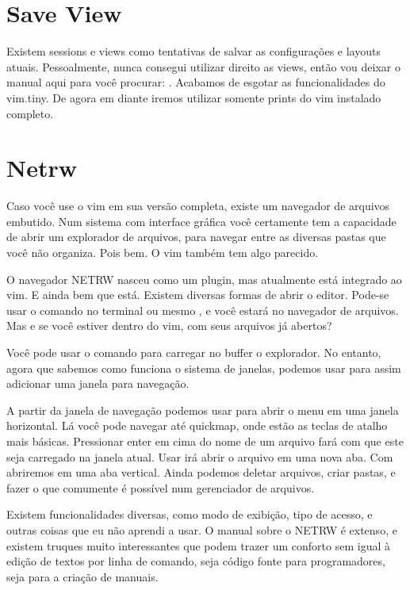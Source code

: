 \section{Save View}
Existem sessions e views como tentativas de salvar as configurações e layouts atuais.
Pessoalmente, nunca consegui utilizar direito as views, então vou deixar o manual aqui para você procurar:
.
Acabamos de esgotar as funcionalidades do vim.tiny.
De agora em diante iremos utilizar somente prints do vim instalado completo.

\section{Netrw}
Caso você use o vim em sua versão completa, existe um navegador de arquivos embutido.
Num sistema com interface gráfica você certamente tem a capacidade de abrir um
explorador de arquivos, para navegar entre as diversas pastas que você não organiza.
Pois bem. O vim também tem algo parecido.


O navegador NETRW nasceu como um plugin, mas atualmente está integrado ao vim.
E ainda bem que está.
Existem diversas formas de abrir o editor.
Pode-se usar o comando no terminal  ou 
mesmo , e você estará no navegador de arquivos.
Mas e se você estiver dentro do vim, com seus arquivos já abertos?

Você pode usar o comando  para carregar no buffer o explorador.
No entanto, agora que sabemos como funciona o sistema de janelas, podemos usar
 para assim adicionar uma janela para navegação.

A partir da janela de navegação podemos usar  para abrir o menu
em uma janela horizontal. Lá você pode navegar até quickmap, onde estão as teclas de atalho mais básicas.
Pressionar enter em cima do nome de um arquivo fará com que este seja carregado na janela atual.
Usar  irá abrir o arquivo em uma nova aba.
Com  abriremos em uma aba vertical.
Ainda podemos deletar arquivos, criar pastas, e fazer o que comumente é possível num gerenciador de arquivos.

Existem funcionalidades diversas, como modo de exibição, tipo de acesso,
e outras coisas que eu não aprendi a usar.
O manual sobre o NETRW é extenso, e existem truques muito interessantes
que podem trazer um conforto sem igual à edição de textos por linha de comando,
seja código fonte para programadores, seja para a criação de manuais.

